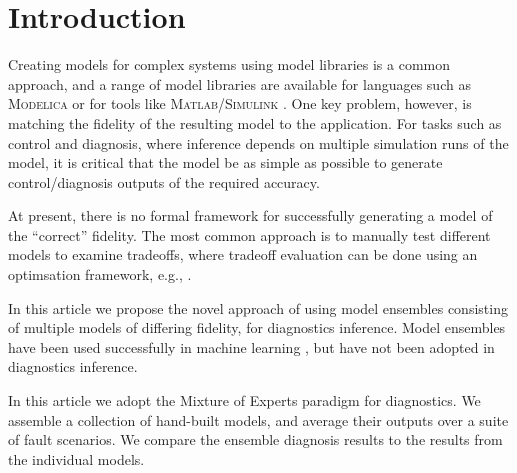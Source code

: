 \section{Introduction}
%
Creating models for complex systems using model libraries is a common
approach, and a range of model libraries are available for languages
such as \textsc{Modelica} \citep{?} or for tools like
\textsc{Matlab}/\textsc{Simulink} \citep{?}. One key problem, however,
is matching the fidelity of the resulting model to the application.
For tasks such as control and diagnosis, where inference depends on
multiple simulation runs of the model, it is critical that the model
be as simple as possible to generate control/diagnosis outputs of the
required accuracy.
\par
At present, there is no formal framework for successfully generating a
model of the ``correct'' fidelity. The most common approach is to
manually test different models to examine tradeoffs, where tradeoff
evaluation can be done using an optimsation framework, e.g.,
\citep{wetter2001genopt}.
\par
In this article we propose the novel approach of using model ensembles
consisting of multiple models of differing fidelity, for diagnostics
inference. Model ensembles have been used successfully in machine
learning \citep{brown2010ensemble,dietterich2000ensemble}, but have
not been adopted in diagnostics inference.
\par
In this article we adopt the Mixture of Experts paradigm
\citep{brown2010ensemble} for diagnostics. We assemble a collection of
hand-built models, and average their outputs over a suite of fault
scenarios. We compare the ensemble diagnosis results to the results
from the individual models.
